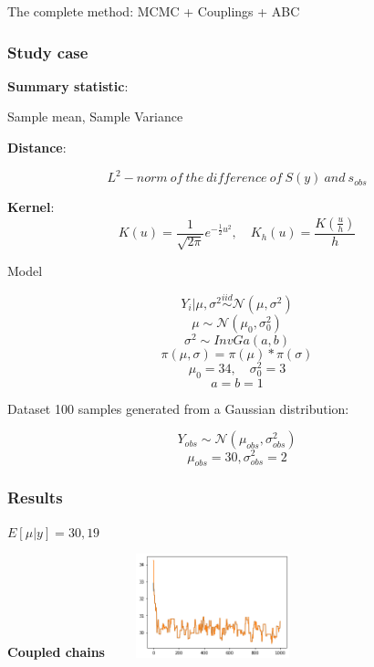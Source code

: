 \documentclass{beamer}
\begin{document}
\begin{section}{The complete method: MCMC + Couplings + ABC}
\begin{frame}
	\frametitle{Study case}
	
		\textbf{Summary statistic}: \\
		\begin{center}
			Sample mean, Sample Variance
		\end{center}
		
		\textbf{Distance}: 
		\begin{center}
			$$L^2-norm\ of\ the\ difference\ of\ S(y)\ and\ s_{obs}$$
		\end{center}   %
		
		\textbf{Kernel}: 
		$$
		K(u) = 
		\frac{1}{\sqrt{2\pi}} e^{-\frac{1}{2}u^2}, 
		\quad K_h(u) 
		= \frac{K(\frac u h)}{h}
		$$
	
\end{frame}

\begin{frame}

\begin{block}{Model}
	\begin{center}
	
		$$ Y_i | \mu, \sigma^2 \overset{iid}{\sim} \mathcal{N}(\mu, \sigma^2) $$
		$$ \mu  \sim \mathcal{N}(\mu_0, \sigma_0^2)  $$
		$$ \sigma^2  \sim InvGa(a,b) $$
		$$ \pi( \mu,\sigma) =\pi(\mu)*\pi(\sigma) $$
		$$ \mu_0 = 34, \quad \sigma^2_0 = 3$$
		$$ a=b=1 $$
		
	\end{center}
\end{block}

\end{frame}

\begin{frame}
\begin{block}{Dataset}
	100 samples generated from a Gaussian distribution:
	\begin{center}
		$$ Y_{obs} \sim \mathcal{N}(\mu_{obs}, \sigma_{obs}^{2}) $$
$$	\mu_{obs} = 30,	\sigma_{obs}^{2} = 2	$$
	\end{center}
\end{block}

\end{frame}



\begin{frame}
	\frametitle{Results}
	$ E[\mu|y]=30,19 $
	\begin{center}
		\begin{minipage}{0.63\textwidth}
			\begin{center}
				{\scriptsize \textbf{Coupled chains}}
				\includegraphics[width=6cm,height=3cm]{immagini_mario/mu_chains}
			\end{center}
		\end{minipage}
		

\end{center}
\end{frame}
\end{section}
\end{document}
